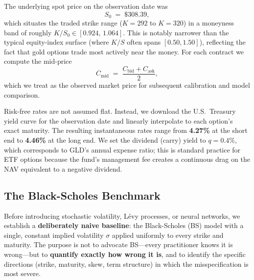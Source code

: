 \documentclass[12pt, a4paper]{article}
\begin{document}
The underlying spot price on the observation date was
\begin{equation}
S_0 \;=\; \$308.39,
\end{equation}
which situates the traded strike range ($K = 292$ to $K = 320$) in a moneyness band of roughly $K/S_0 \in [0.924,\, 1.064]$. This is notably narrower than the typical equity-index surface (where $K/S$ often spans $[0.50, 1.50]$), reflecting the fact that gold options trade most actively near the money. For each contract we compute the mid-price
\begin{equation}
C_{\text{mid}} \;=\; \frac{C_{\text{bid}} + C_{\text{ask}}}{2},
\end{equation}
which we treat as the observed market price for subsequent calibration and model comparison.

Risk-free rates are not assumed flat. Instead, we download the U.S.\ Treasury yield curve for the observation date and linearly interpolate to each option's exact maturity. The resulting instantaneous rates range from \textbf{4.27\%} at the short end to \textbf{4.46\%} at the long end. We set the dividend (carry) yield to $q = 0.4\%$, which corresponds to GLD's annual expense ratio; this is standard practice for ETF options because the fund's management fee creates a continuous drag on the NAV equivalent to a negative dividend.

\subsection{The Black-Scholes Benchmark}
\label{subsec:bs-benchmark}

Before introducing stochastic volatility, L\'evy processes, or neural networks, we establish a \textbf{deliberately naive baseline}: the Black-Scholes (BS) model with a single, constant implied volatility $\sigma$ applied uniformly to every strike and maturity. The purpose is not to advocate BS---every practitioner knows it is wrong---but to \textbf{quantify exactly how wrong it is}, and to identify the specific directions (strike, maturity, skew, term structure) in which the misspecification is most severe.
\end{document}
